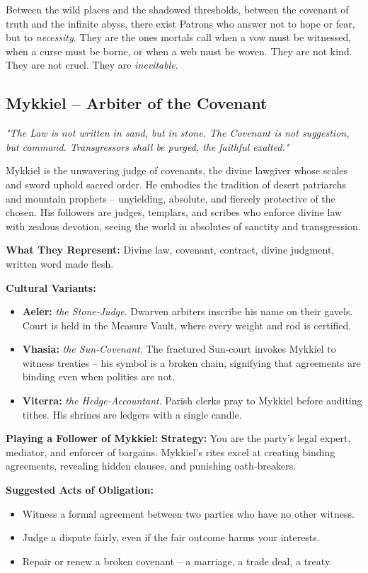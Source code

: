 \documentclass[10pt,a5paper]{book}
\begin{document}
Between the wild places and the shadowed thresholds, between the covenant of truth and the infinite abyss, there exist Patrons who answer not to hope or fear, but to \textit{necessity}. They are the ones mortals call when a vow must be witnessed, when a curse must be borne, or when a web must be woven. They are not kind. They are not cruel. They are \textit{inevitable}.

\subsection{Mykkiel -- Arbiter of the Covenant}
\label{patron:mykkiel}

\textit{"The Law is not written in sand, but in stone. The Covenant is not suggestion, but command. Transgressors shall be purged, the faithful exalted."}

Mykkiel is the unwavering judge of covenants, the divine lawgiver whose scales and sword uphold sacred order. He embodies the tradition of desert patriarchs and mountain prophets -- unyielding, absolute, and fiercely protective of the chosen. His followers are judges, templars, and scribes who enforce divine law with zealous devotion, seeing the world in absolutes of sanctity and transgression.

\textbf{What They Represent:} Divine law, covenant, contract, divine judgment, written word made flesh.

\textbf{Cultural Variants:}
\begin{itemize}
    \item \textbf{Aeler:} \textit{the Stone‑Judge}. Dwarven arbiters inscribe his name on their gavels. Court is held in the Measure Vault, where every weight and rod is certified.
    \item \textbf{Vhasia:} \textit{the Sun‑Covenant}. The fractured Sun‑court invokes Mykkiel to witness treaties -- his symbol is a broken chain, signifying that agreements are binding even when polities are not.
    \item \textbf{Viterra:} \textit{the Hedge‑Accountant}. Parish clerks pray to Mykkiel before auditing tithes. His shrines are ledgers with a single candle.
\end{itemize}

\textbf{Playing a Follower of Mykkiel:}
\textbf{Strategy:} You are the party's legal expert, mediator, and enforcer of bargains. Mykkiel's rites excel at creating binding agreements, revealing hidden clauses, and punishing oath‑breakers.

\textbf{Suggested Acts of Obligation:}
\begin{itemize}
    \item Witness a formal agreement between two parties who have no other witness.
    \item Judge a dispute fairly, even if the fair outcome harms your interests.
    \item Repair or renew a broken covenant -- a marriage, a trade deal, a treaty.
\end{itemize}
\end{document}
